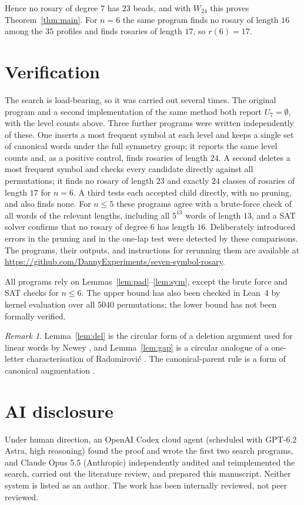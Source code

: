 \documentclass[a4paper,11pt]{amsart}
\theoremstyle{remark}
\newtheorem{remark}[theorem]{Remark}
\begin{document}
Hence no rosary of degree $7$ has $23$ beads, and with $W_{24}$ this proves
Theorem~\ref{thm:main}.  For $n=6$ the same program finds no rosary of length
$16$ among the $35$ profiles and finds rosaries of length $17$, so $r(6)=17$.

\section{Verification}

The search is load-bearing, so it was carried out several times.  The
original program and a second implementation of the same method both report
$U_7=\emptyset$, with the level counts above.  Three further programs were
written independently of these.  One inserts a most frequent symbol at each
level and keeps a single set of canonical words under the full symmetry
group; it reports the same level counts and, as a positive control, finds
rosaries of length $24$.  A second deletes a most frequent symbol and checks
every candidate directly against all permutations; it finds no rosary of
length $23$ and exactly $24$ classes of rosaries of length $17$ for $n=6$.
A third tests each accepted child directly, with no pruning, and also finds
none.  For $n\le5$ these programs agree with a brute-force check of all
words of the relevant lengths, including all $5^{13}$ words of length $13$,
and a SAT solver confirms that no rosary of degree $6$ has length $16$.
Deliberately introduced errors in the pruning and in the one-lap test were
detected by these comparisons.  The programs, their outputs, and
instructions for rerunning them are available at
\url{https://github.com/DannyExperiments/seven-symbol-rosary}.

All programs rely on Lemmas~\ref{lem:pad}--\ref{lem:sym}, except the brute
force and SAT checks for $n\le6$.  The upper bound has also been checked in
Lean~4 by kernel evaluation over all $5040$ permutations; the lower bound has
not been formally verified.

\begin{remark}
Lemma~\ref{lem:del} is the circular form of a deletion argument used for
linear words by Newey \cite{Newey1973}, and Lemma~\ref{lem:gap} is a circular
analogue of a one-letter characterisation of Radomirovi\'c
\cite[Theorem~5]{Radomirovic2012}.  The canonical-parent rule is a form of
canonical augmentation \cite{McKay1998}.
\end{remark}

\section*{AI disclosure}
Under human direction, an OpenAI Codex cloud agent (scheduled with GPT-6.2
Astra, high reasoning) found the proof and wrote the first two search
programs, and Claude Opus 5.5 (Anthropic) independently audited and
reimplemented the search, carried out the literature review, and prepared
this manuscript.  Neither system is listed as an author.  The work has been
internally reviewed, not peer reviewed.

\renewcommand{\bibliofont}{\footnotesize\raggedright}


\end{document}
